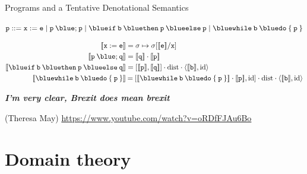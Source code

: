 \documentclass{beamer}
\begin{document}
\begin{frame}{Programs and a Tentative Denotational Semantics}
        \begin{block}{\vspace*{-3.5ex}}
        \begin{center}
        $\prog{p} ::= \mathtt{x} := \mathtt{e} \mid
	\mathtt{p \> {\blue ;} \> p} \mid
	\mathtt{{\blue if} \> b \> {\blue then} \> p \> {\blue else} \> p} \mid
	\mathtt{{\blue while} \> b \> {\blue do} \> \{ \> p \> \}}$
        \end{center}
	\end{block}
        \vspace{-0.5cm}
        \begin{align*}
                \sem{\prog{x : = e}} & = \sigma \mapsto \sigma[\sem{\prog{e}}/\prog{x}] \\
                \sem{\prog{p} \> {\blue ;} \> \prog{q}} & 
                = \sem{\prog{q}} \comp \sem{\prog{p}} \\
                \sem{\mathtt{{\blue if} \> b \> {\blue then} \> p \> {\blue else} \> q}}
                                                        & 
                                                        = [\sem{\prog{p}},\sem{\prog{q}}] \comp
                                                        \mathrm{dist} \comp \pv{\sem{\prog{b}}}{\id}
                \\
                \sem{\mathtt{{\blue while} \> b \> {\blue do} \> \{ \> p \> \}} }
                                                        & \> {=} \>
                [\sem{\mathtt{{\blue while} \> b \> {\blue do} \> \{ \> p \> \}} } \comp 
                \sem{\prog{p}},\id] \comp
                \mathrm{dist} \comp \pv{\sem{\prog{b}}}{\id}
        \end{align*}

        \pause
        \smallskip
        \begin{flushright}
        \emph{\textbf{I'm very clear, Brexit does mean brexit}}

        \scriptsize{(Theresa May) \url{https://www.youtube.com/watch?v=oRDfFJAu6Bo}}
        \end{flushright}
\end{frame}

\section{Domain theory}
\end{document}
